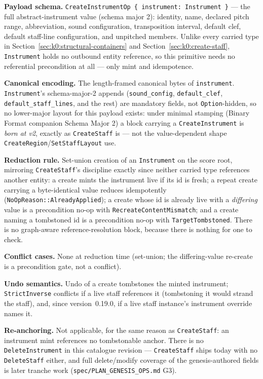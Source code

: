 \documentclass[11pt,letterpaper]{report}
\newcommand{\sectionsc}[1]{{\addfontfeatures{Letters=SmallCaps}#1}}
\begin{document}
\textbf{Payload schema.} \texttt{CreateInstrumentOp \{ instrument: Instrument
\}} --- the full abstract-instrument value (schema major 2): identity, name,
declared pitch range, abbreviation, sound configuration, transposition
interval, default clef, default staff-line configuration, and unpitched
members. Unlike every carried type in
Section~\ref{sec:k0:structural-containers} and
Section~\ref{sec:k0:create-staff}, \texttt{Instrument} holds no outbound
entity reference, so this primitive needs no referential precondition at
all --- only mint and idempotence.

\textbf{Canonical encoding.} The length-framed canonical bytes of
\texttt{instrument}. \texttt{Instrument}'s schema-major-2 appends
(\texttt{sound\_config}, \texttt{default\_clef},
\texttt{default\_staff\_lines}, and the rest) are mandatory fields, not
\texttt{Option}-hidden, so no lower-major layout for this payload exists:
under minimal stamping (Binary Format companion \sectionsc{Schema Major 2})
a block carrying a \texttt{CreateInstrument} is \emph{born at v2}, exactly
as \texttt{CreateStaff} is --- not the value-dependent shape
\texttt{CreateRegion}/\texttt{SetStaffLayout} use.

\textbf{Reduction rule.} Set-union creation of an \texttt{Instrument} on the
score root, mirroring \texttt{CreateStaff}'s discipline exactly since
neither carried type references another entity: a create mints the
instrument live if its id is fresh; a repeat create carrying a
byte-identical value reduces idempotently
(\texttt{NoOpReason::AlreadyApplied}); a create whose id is already live
with a \emph{differing} value is a precondition no-op with
\texttt{RecreateContentMismatch}; and a create naming a tombstoned id is a
precondition no-op with \texttt{TargetTombstoned}. There is no
graph-aware reference-resolution block, because there is nothing for one to
check.

\textbf{Conflict cases.} None at reduction time (set-union; the
differing-value re-create is a precondition gate, not a conflict).

\textbf{Undo semantics.} Undo of a create tombstones the minted instrument;
\texttt{StrictInverse} conflicts if a live staff references it (tombstoning
it would strand the staff), and, since version~0.19.0, if a live staff
instance's instrument override names it.

\textbf{Re-anchoring.} Not applicable, for the same reason as
\texttt{CreateStaff}: an instrument mint references no tombstonable anchor.
There is no \texttt{DeleteInstrument} in this catalogue revision ---
\texttt{CreateStaff} ships today with no \texttt{DeleteStaff} either, and
full delete/modify coverage of the genesis-authored fields is later
tranche work (\texttt{spec/PLAN\_GENESIS\_OPS.md} G3).
\end{document}
